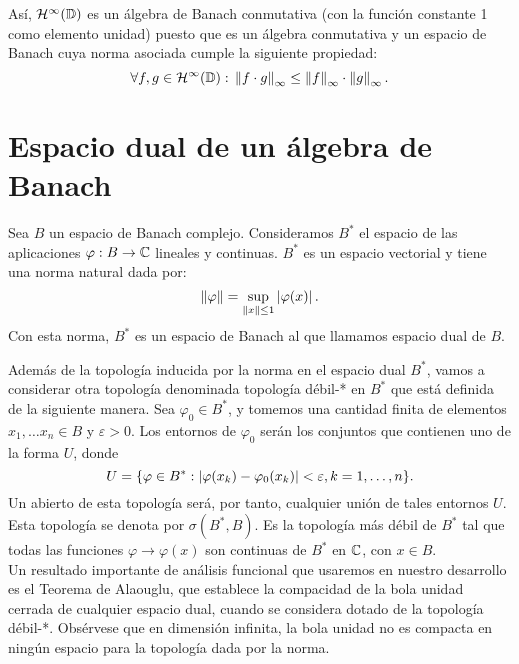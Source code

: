 Así, $\mathcal{H}^{\infty}(\mathbb{D})$ es un álgebra de Banach conmutativa (con la función constante 1 como elemento unidad) puesto que es un álgebra conmutativa y un espacio de Banach cuya norma asociada cumple la siguiente propiedad:
\begin{equation*}
    \forall f, g \in \mathcal{H}^{\infty}(\mathbb{D}): \, \left\lVert f \cdot g\right\rVert_{\infty} \leq \left\lVert f\right\rVert_{\infty} \cdot \left\lVert g\right\rVert_{\infty}.
\end{equation*}

\section{Espacio dual de un álgebra de Banach}

\begin{definition}
    Sea $B$ un espacio de Banach complejo. Consideramos $B^*$ el espacio de las aplicaciones $\varphi: B \to \mathbb{C}$ lineales y continuas. $B^*$ es un espacio vectorial y tiene una norma natural dada por:
    \begin{equation*}
        \left\lVert\varphi\right\rVert = \sup_{\left\lVert x\right\rVert \leq 1} \left\lvert\varphi(x)\right\rvert.
    \end{equation*}
    Con esta norma, $B^*$ es un espacio de Banach al que llamamos espacio dual de $B$. \\
\end{definition}

Además de la topología inducida por la norma en el espacio dual $B^*$, vamos a considerar otra topología denominada topología débil-* en $B^*$ que está definida de la siguiente manera. Sea $\varphi_0 \in B^*$, y tomemos una cantidad finita de elementos $x_1, \dots x_n \in B$ y $\varepsilon > 0$. Los entornos de $\varphi_0$ serán los conjuntos que contienen uno de la forma $U$, donde
\begin{equation*}
U = \{ \varphi \in B^*: \left\lvert\varphi(x_k) - \varphi_0 (x_k)\right\rvert < \varepsilon, k = 1, \dots, n\}.
\end{equation*}
Un abierto de esta topología será, por tanto, cualquier unión de tales entornos $U$. \\

Esta topología se denota por $\sigma(B^*, B)$. Es la topología más débil de $B^*$ tal que todas las funciones $\varphi \to \varphi(x)$ son continuas de $B^*$ en $\mathbb{C}$, con $x \in B$. \\ %

Un resultado importante de análisis funcional que usaremos en nuestro desarrollo es el Teorema de Alaouglu, que establece la compacidad de la bola unidad cerrada de cualquier espacio dual, cuando se considera dotado de la topología débil-*. Obsérvese que en dimensión infinita, la bola unidad no es compacta en ningún espacio para la topología dada por la norma. \\

